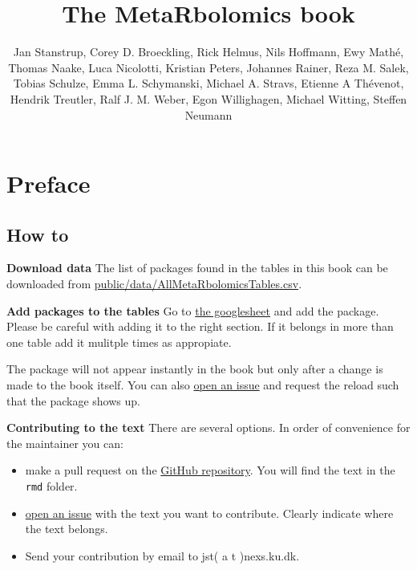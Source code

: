 \documentclass[]{article}
\title{The MetaRbolomics book}
\author{Jan Stanstrup, Corey D. Broeckling, Rick Helmus, Nils Hoffmann, Ewy Mathé, Thomas Naake, Luca Nicolotti, Kristian Peters, Johannes Rainer, Reza M. Salek, Tobias Schulze, Emma L. Schymanski, Michael A. Stravs, Etienne A Thévenot, Hendrik Treutler, Ralf J. M. Weber, Egon Willighagen, Michael Witting, Steffen Neumann}
\date{}
\providecommand{\tightlist}{%
  \setlength{\itemsep}{0pt}\setlength{\parskip}{0pt}}
\begin{document}
\maketitle

{
\hypersetup{linkcolor=black}
\setcounter{tocdepth}{2}
\tableofcontents
}
\newpage

\hypertarget{preface}{%
\section*{Preface}\label{preface}}

\hypertarget{how-to}{%
\subsection*{How to}\label{how-to}}

\textbf{Download data}
The list of packages found in the tables in this book can be downloaded from
\url{public/data/AllMetaRbolomicsTables.csv}.

\textbf{Add packages to the tables}
Go to \href{https://docs.google.com/spreadsheets/d/1QTe_FhiiFEJJ7hn25V973OV3Y9up8CsiLXgZXgTg_UU/edit?usp=sharing}{the googlesheet}
and add the package. Please be careful with adding it to the right section.
If it belongs in more than one table add it mulitple times as appropiate.

The package will not appear instantly in the book but only after a change is made to
the book itself. You can also \href{https://github.com/rformassspectrometry/metaRbolomics-book/issues}{open an issue}
and request the reload such that the package shows up.

\textbf{Contributing to the text}
There are several options. In order of convenience for the maintainer you can:

\begin{itemize}
\tightlist
\item
  make a pull request on the \href{https://github.com/rformassspectrometry/metaRbolomics-book}{GitHub repository}. You will find the text in the \texttt{rmd} folder.
\item
  \href{https://github.com/rformassspectrometry/metaRbolomics-book/issues}{open an issue} with the text you want to contribute. Clearly indicate where the text belongs.
\item
  Send your contribution by email to jst( a t )nexs.ku.dk.
\end{itemize}
\end{document}
